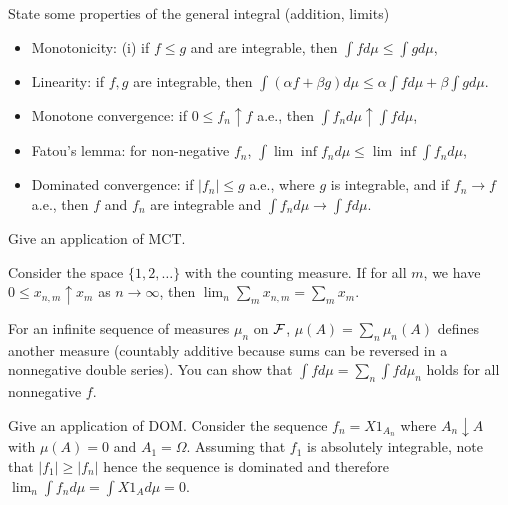 \documentclass[avery5388,grid,frame]{flashcards}
\begin{document}
\begin{flashcard}
    {State some properties of the general integral (addition, limits)}
    \begin{properties}
        \begin{itemize}
            \item Monotonicity: (i) if $f \leq g$ and are integrable, then $\int f d\mu \leq \int g d\mu$,
            \item Linearity: if $f,g$ are integrable, then $\int (\alpha f + \beta g) d\mu \leq \alpha \int f d\mu + \beta \int g d\mu$.
            \item Monotone convergence: if $0 \leq f_n \uparrow f$ a.e., then $\int f_n d\mu \uparrow \int f d\mu$,
            \item Fatou's lemma: for non-negative $f_n$, $\int \lim \inf f_n d\mu \leq \lim \inf \int f_n d\mu$,
            \item Dominated convergence: if $|f_n| \leq g$ a.e., where $g$ is integrable, and if $f_n \rightarrow f$ a.e., then $f$ and $f_n$ are integrable and $\int f_n d\mu \rightarrow \int f d\mu$.
        \end{itemize}
    \end{properties}
\end{flashcard}


\begin{flashcard}
    {Give an application of MCT.}
    \begin{example}
        Consider the space $\{ 1, 2, \dots \}$ with the counting measure. If for all $m$, we have $0 \leq x_{n,m} \uparrow x_m$ as $n \rightarrow \infty$, then $\lim_n \sum_m x_{n,m} = \sum_m x_m$.
    \end{example}
    \begin{example}
        For an infinite sequence of measures $\mu_n$ on $\mathcal F$, $\mu(A) = \sum_n \mu_n(A)$ defines another measure (countably additive because sums can be reversed in a nonnegative double series). You can show that $\int f d\mu = \sum_n \int f d\mu_n$ holds for all nonnegative $f$.
    \end{example}
\end{flashcard}


\begin{flashcard}
    {Give an application of DOM.}
    Consider the sequence $f_n = X 1_{A_n} $ where $A_n \downarrow A$ with $\mu(A) = 0$ and $A_1 = \Omega$. Assuming that $f_1$ is absolutely integrable, note that $|f_1| \geq |f_n|$ hence the sequence is dominated and therefore $\lim_n \int f_n d\mu = \int X 1_{A} d\mu = 0$.
\end{flashcard}
\end{document}
